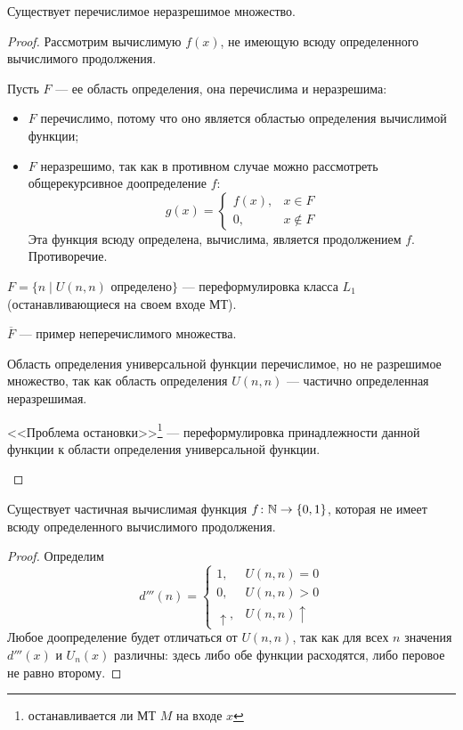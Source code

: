 \begin{thm}
    Существует перечислимое неразрешимое множество.
\end{thm}
\begin{proof}
	Рассмотрим вычислимую $ f(x)$, не имеющую всюду определенного вычислимого продолжения.

	Пусть $ F$ --- ее область определения, она перечислима и неразрешима:
	\begin{itemize}
		\item $ F$ перечислимо, потому что оно является областью определения вычислимой функции;
		\item $ F$ неразрешимо, так как в противном случае можно
			рассмотреть общерекурсивное доопределение $ f$:
			 \[
				 g(x) = \begin{cases}
					 f(x), & x \in F \\
					 0, & x \notin F 
				 \end{cases}
			\] 
			Эта функция всюду определена, вычислима, является продолжением $ f$. Противоречие.
	\end{itemize}
\begin{note}
	$ F = \{n \mid U(n, n) \text{ определено}\}$ --- переформулировка класса $ L_1$ (останавливающиеся на своем входе МТ).
\end{note}
\begin{note}
    $ \overline{F}$ --- пример неперечислимого множества.
\end{note}
\begin{note}
    Область определения универсальной функции перечислимое, но не разрешимое множество, 
	так как область определения $ U(n, n)$ --- частично определенная неразрешимая.
\end{note}
\begin{note}
	<<Проблема остановки>>\footnote{останавливается ли МТ $ M$ на входе $ x$} --- переформулировка принадлежности данной функции к области определения универсальной функции.
\end{note}
\end{proof}


\begin{thm}
    Существует частичная вычислимая функция $ f\colon  \mathbb{N} \to  \{0, 1\}$, которая не имеет  всюду определенного вычислимого продолжения.
\end{thm}
\begin{proof}
    Определим
	\[
		d'''(n) = \begin{cases}
		1, & U(n, n) = 0 \\
		0, & U(n, n) > 0 \\
		\uparrow, & U(n, n) \uparrow
	\end{cases}
	\] 
	Любое доопределение будет отличаться от $ U(n, n)$, так как для всех $ n$ значения $ d'''(x) $ и $ U_n(x)$ различны: здесь либо обе функции расходятся, либо перовое не равно второму.
\end{proof}

